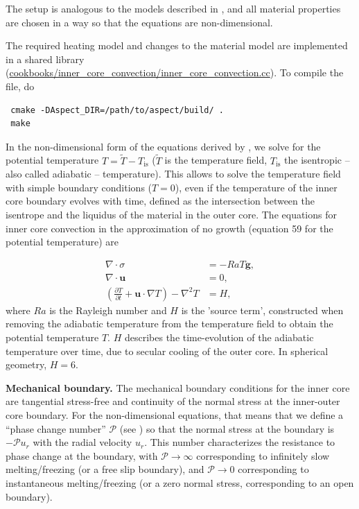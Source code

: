 \documentclass{article}
\begin{document}
The setup is analogous to the models described in \cite{Deguen2013}, and all material properties
are chosen in a way so that the equations are non-dimensional.

The required heating model and changes to the material model are implemented in a shared library
(\url{cookbooks/inner_core_convection/inner_core_convection.cc}). To compile the file, do

\begin{verbatim}
 cmake -DAspect_DIR=/path/to/aspect/build/ .
 make
\end{verbatim}

In the non-dimensional form of the equations derived by \cite{Deguen2013}, we solve for the potential temperature $T = \tilde{T}-T_{\text{is}}$ ($\tilde{T}$ is the temperature field, $T_{\text{is}}$ the isentropic -- also called adiabatic -- temperature). This allows to solve the temperature field with simple boundary conditions ($T=0$), even if the temperature of the inner core boundary evolves with time, defined as the intersection between the isentrope and the liquidus of the material in the outer core.
The equations for inner core convection in the approximation of no growth (equation 59 for the potential temperature) are

\begin{align}
  \label{eq:inner-core-1}
  \nabla \cdot \sigma &=
  -Ra T \mathbf g,
  \\
  \label{eq:inner-core-2}
  \nabla \cdot \mathbf u &= 0,
  \\
  \label{eq:inner-core-3}
  \left(\frac{\partial T}{\partial t} + \mathbf u\cdot\nabla T\right)
  - \nabla^2 T
  &=
  H,
\end{align}
where $Ra$ is the Rayleigh number and $H$ is the 'source term', constructed when removing the adiabatic temperature from the temperature field to obtain the potential temperature $T$. $H$ describes the time-evolution of the adiabatic temperature over time, due to secular cooling of the outer core.
In spherical geometry, $H=6$.


\vspace{0.3cm}
\textbf{Mechanical boundary.}
The mechanical boundary conditions for the inner core are
tangential stress-free and continuity of the normal stress at the
inner-outer core boundary. For the non-dimensional equations, that
means that we define a ``phase change number'' $\mathcal{P}$ (see \cite{Deguen2013}) so that the
normal stress at the boundary is $-\mathcal{P} u_r$ with the radial velocity
$u_r$. This number characterizes the resistance to phase change at
the boundary, with $\mathcal{P}\rightarrow\infty$ corresponding to infinitely slow
melting/freezing (or a free slip boundary), and $\mathcal{P}\rightarrow0$ corresponding to
instantaneous melting/freezing (or a zero normal stress, corresponding to an open boundary).
\end{document}
